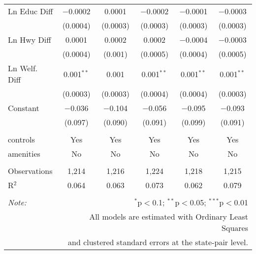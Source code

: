 \begin{table}[!htbp]
\begin{tabular}{@{\extracolsep{5pt}}lccccc}
  Ln Educ Diff & $-$0.0002 & 0.0001 & $-$0.0002 & $-$0.0001 & $-$0.0003 \\ 
  & (0.0004) & (0.0003) & (0.0003) & (0.0003) & (0.0003) \\ 
  Ln Hwy Diff & 0.0001 & 0.0002 & 0.0002 & $-$0.0004 & $-$0.0003 \\ 
  & (0.0004) & (0.001) & (0.0005) & (0.0004) & (0.0005) \\ 
  Ln Welf. Diff & 0.001$^{**}$ & 0.001 & 0.001$^{**}$ & 0.001$^{**}$ & 0.001$^{**}$ \\ 
  & (0.0003) & (0.0003) & (0.0004) & (0.0004) & (0.0003) \\ 
  Constant & $-$0.036 & $-$0.104 & $-$0.056 & $-$0.095 & $-$0.093 \\ 
  & (0.097) & (0.090) & (0.091) & (0.099) & (0.091) \\ 
 \hline \\[-1.8ex] 
controls & Yes & Yes & Yes & Yes & Yes \\ 
amenities & No & No & No & No & No \\ 
\hline \\[-1.8ex] 
Observations & 1,214 & 1,216 & 1,224 & 1,218 & 1,215 \\ 
R$^{2}$ & 0.064 & 0.063 & 0.073 & 0.062 & 0.079 \\ 
\hline 
\hline \\[-1.8ex] 
\textit{Note:}  & \multicolumn{5}{r}{$^{*}$p$<$0.1; $^{**}$p$<$0.05; $^{***}$p$<$0.01} \\ 
 & \multicolumn{5}{r}{All models are estimated with Ordinary Least Squares} \\ 
 & \multicolumn{5}{r}{and clustered standard errors at the state-pair level.} \\ 
\end{tabular} 
\end{table} 
